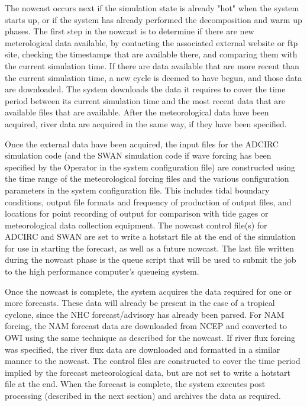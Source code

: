 \documentclass[12pt]{article}
\begin{document}
The nowcast occurs next if the simulation state is already "hot" 
when the system starts up, or if the system has already performed 
the decomposition and warm up phases. The first step in the nowcast 
is to determine if there are new meterological data available, by 
contacting the associated external website or ftp site, checking the 
timestamps that are available there, and comparing them with the 
current simulation time. If there are data available that are more 
recent than the current simulation time, a new cycle is deemed to 
have begun, and those data are downloaded. The system downloads the 
data it requires to cover the time period between its current 
simulation time and the most recent data that are available files 
that are available. After the meteorological data have been 
acquired, river data are acquired in the same way, if they have been 
specified. 

Once the external data have been acquired, the input files for the 
ADCIRC simulation code (and the SWAN simulation code if wave forcing 
has been specified by the Operator in the system configuration file) 
are constructed using the time range of the meteorological forcing 
files and the various configuration parameters in the system 
configuration file. This includes tidal boundary conditions, output 
file formats and frequency of production of output files, and 
locations for point recording of output for comparison with tide 
gages or meteorological data collection equipment. The nowcast 
control file(s) for ADCIRC and SWAN are set to write a hotstart file 
at the end of the simulation for use in starting the forecast, as 
well as a future nowcast. The last file written during the nowcast 
phase is the queue script that will be used to submit the job to the 
high performance computer's queueing system.

Once the nowcast is complete, the system acquires the data required 
for one or more forecasts. These data will already be present in the 
case of a tropical cyclone, since the NHC forecast/advisory has 
already been parsed. For NAM forcing, the NAM forecast data are 
downloaded from NCEP and converted to OWI using the same technique 
as described for the nowcast. If river flux forcing was specified, 
the river flux data are downloaded and formatted in a similar manner 
to the nowcast. The control files are constructed to cover the time 
period implied by the forecast meteorological data, but are not set 
to write a hotstart file at the end. When the forecast is complete, 
the system executes post processing (described in the next section) 
and archives the data as required. 
\end{document}
